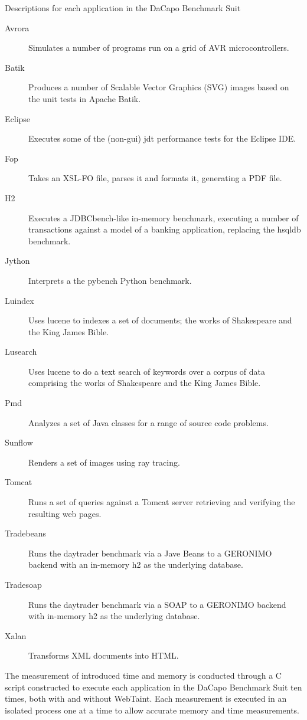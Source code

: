 \begin{table}[H]
  \centering
  \caption{Descriptions for each application in the DaCapo Benchmark Suit \parencite{dacapoBench}}
    \label{table:DaCapoTests}
    \begin{description}
        \item [Avrora] Simulates a number of programs run on a grid of AVR microcontrollers.
        \item [Batik] Produces a number of Scalable Vector Graphics (SVG) images based on the unit tests in Apache Batik.
        \item [Eclipse] Executes some of the (non-gui) jdt performance tests for the Eclipse IDE.
        \item [Fop] Takes an XSL-FO file, parses it and formats it, generating a PDF file.
        \item [H2] Executes a JDBCbench-like in-memory benchmark, executing a number of transactions against a model of a banking application, replacing the hsqldb benchmark.
        \item [Jython] Interprets a the pybench Python benchmark.
        \item [Luindex] Uses lucene to indexes a set of documents; the works of Shakespeare and the King James Bible.
        \item [Lusearch] Uses lucene to do a text search of keywords over a corpus of data comprising the works of Shakespeare and the King James Bible.
        \item [Pmd] Analyzes a set of Java classes for a range of source code problems.
        \item [Sunflow] Renders a set of images using ray tracing.
        \item [Tomcat] Runs a set of queries against a Tomcat server retrieving and verifying the resulting web pages.
        \item [Tradebeans] Runs the daytrader benchmark via a Jave Beans to a GERONIMO backend with an in-memory h2 as the underlying database.
        \item [Tradesoap] Runs the daytrader benchmark via a SOAP to a GERONIMO backend with in-memory h2 as the underlying database.
        \item [Xalan] Transforms XML documents into HTML.
    \end{description}
\end{table}

The measurement of introduced time and memory is conducted through a C script constructed to execute each application in the DaCapo Benchmark Suit ten times, both with and without WebTaint. Each measurement is executed in an isolated process one at a time to allow accurate memory and time measurements.
